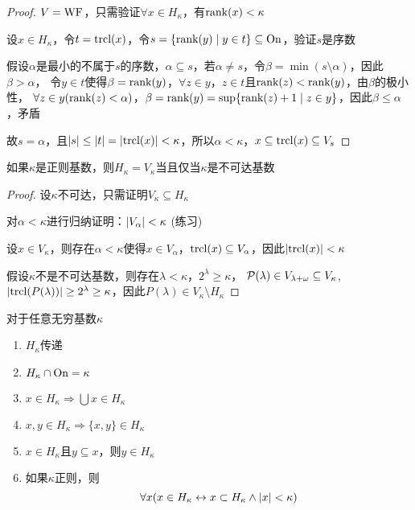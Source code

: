 \documentclass[11pt]{article}
\begin{document}
\begin{proof}
\(V=\operatorname{WF}\)，只需验证\(\forall x\in H_\kappa\)，有\(\text{rank}(x)<\kappa\)

设\(x\in H_\kappa\)，令\(t=\operatorname{\text{trcl}}(x)\)，令\(s=\{\text{rank}(y)\mid y\in t\}\subseteq\operatorname{On}\)，验证\(s\)是序数

假设\(\alpha\)是最小的不属于\(s\)的序数，\(\alpha\subseteq s\)，若\(\alpha\neq s\)，令\(\beta=\min(s\setminus\alpha)\)，因此\(\beta>\alpha\)，
令\(y\in t\)使得\(\beta=\text{rank}(y)\)，\(\forall z\in y\)，\(z\in t\)且\(\text{rank}(z)<\text{rank}(y)\)，由\(\beta\)的极小性，
\(\forall z\in y(\text{rank}(z)<\alpha)\)，\(\beta=\text{rank}(y)=\sup\{\text{rank}(z)+1\mid z\in y\}\)，因此\(\beta\le\alpha\)，矛盾

故\(s=\alpha\)，且\(\abs{s}\le\abs{t}=\abs{\trcl(x)}<\kappa\)，所以\(\alpha<\kappa\)，\(x\subseteq\operatorname{\text{trcl}}(x)\subseteq V_s\)
\end{proof}

\begin{lemma}[]
如果\(\kappa\)是正则基数，则\(H_\kappa=V_\kappa\)当且仅当\(\kappa\)是不可达基数
\end{lemma}

\begin{proof}
设\(\kappa\)不可达，只需证明\(V_\kappa\subseteq H_\kappa\)

对\(\alpha<\kappa\)进行归纳证明：\(\abs{V_\alpha}<\kappa\) (练习)

设\(x\in V_\kappa\)，则存在\(\alpha<\kappa\)使得\(x\in V_\alpha\)，\(\operatorname{\text{trcl}}(x)\subseteq V_\alpha\)，因此\(\abs{\trcl(x)}<\kappa\)

假设\(\kappa\)不是不可达基数，则存在\(\lambda<\kappa\)，\(2^\lambda\ge\kappa\)，
\(\mathcal{P}(\lambda)\in V_{\lambda+\omega}\subseteq V_\kappa\),\(\abs{\trcl(P(\lambda))}\ge 2^\lambda\ge\kappa\)，因此\(P(\lambda)\in V_\kappa\setminus H_\kappa\)
\end{proof}

\begin{lemma}[]
对于任意无穷基数\(\kappa\)
\begin{enumerate}
\item \(H_\kappa\)传递
\item \(H_\kappa\cap\operatorname{On}=\kappa\)
\item \(x\in H_\kappa\Rightarrow\bigcup x\in H_\kappa\)
\item \(x,y\in H_\kappa\Rightarrow\{x,y\}\in H_\kappa\)
\item \(x\in H_\kappa\)且\(y\subseteq x\)，则\(y\in H_\kappa\)
\item 如果\(\kappa\)正则，则
\begin{equation*}
\forall x(x\in H_\kappa\leftrightarrow x\subset H_\kappa\wedge\abs{x}<\kappa)
\end{equation*}
\end{enumerate}
\end{lemma}
\end{document}
